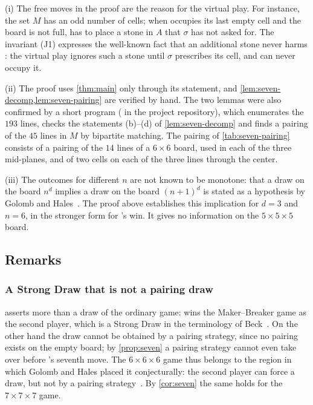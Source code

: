 \begin{remark}\label{rem:seven}
(i) The free moves in the proof are the reason for the virtual play. For instance, the set $M$ has an
odd number of cells; when \Maker{} occupies its last empty cell and the board is not full, \Breaker{}
has to place a stone in $A$ that $\sigma$ has not asked for. The invariant (J1) expresses the well-known fact that an additional stone never
harms \Breaker: the virtual play ignores such a stone until $\sigma$ prescribes its cell, and \Maker{}
can never occupy it.

(ii) The proof uses \cref{thm:main} only through its statement, and \cref{lem:seven-decomp,lem:seven-pairing}
are verified by hand. The two lemmas were also confirmed by a short program
( in the project repository), which enumerates the $193$ lines,
checks the statements (b)--(d) of \cref{lem:seven-decomp} and finds a pairing of the $45$ lines in $M$ by
bipartite matching. The pairing of \cref{tab:seven-pairing} consists of a pairing of the $14$ lines of
a $6\times6$ board, used in each of the three mid-planes, and of two cells on each of the three lines
through the center.

(iii) The outcomes for different $n$ are not known to be monotone: that a draw on the board $n^d$
implies a draw on the board $(n+1)^d$ is stated as a hypothesis by Golomb and
Hales~\cite[Section~8]{GolombHales2002}. The proof above establishes this implication for $d=3$ and
$n=6$, in the stronger form for \Breaker's win. It gives no information on the $5\times5\times5$
board.
\end{remark}

\subsection{Remarks}\label{ssec:remarks}

\subsubsection*{A Strong Draw that is not a pairing draw}
 asserts more than a draw of the ordinary game: \Breaker{} wins the Maker--Breaker game as
the second player, which is a Strong Draw in the terminology of Beck~\cite{Beck2008}. On the other hand
the draw cannot be obtained by a pairing strategy, since no pairing exists on the empty board; by
\cref{prop:seven} a pairing strategy cannot even take over before \Breaker's seventh move. The
$6\times6\times6$ game thus belongs to the region in which Golomb and Hales placed it conjecturally:
the second player can force a draw, but not by a pairing strategy~\cite[Table~1]{GolombHales2002}. By
\cref{cor:seven} the same holds for the $7\times7\times7$ game.

